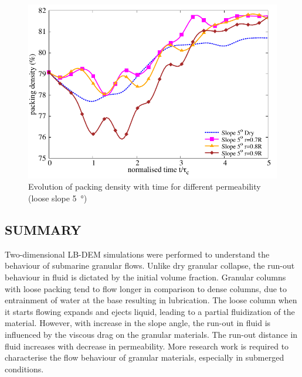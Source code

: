 \begin{figure}
\centering
\includegraphics[width=0.97\columnwidth]{Voronoi_5}
\caption{Evolution of packing density with time for different permeability (loose slope \SI{5}{\degree})}
\label{fig:voro5}
\end{figure}

\subsection{SUMMARY}

Two-dimensional LB-DEM simulations were performed to understand the behaviour of submarine granular flows. Unlike dry granular collapse, the run-out behaviour in fluid is dictated by the initial volume fraction. Granular columns with loose packing tend to flow longer in comparison to dense columns, due to entrainment of water at the base resulting in lubrication. The loose column when it starts flowing expands and ejects liquid, leading to a partial fluidization of the material. However, with increase in the slope angle, the run-out in fluid is influenced by the viscous drag on the granular materials. The run-out distance in fluid increases with decrease in permeability. More research work is required to characterise the flow behaviour of granular materials, especially in submerged conditions.
